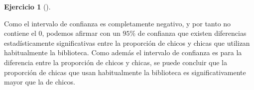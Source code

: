 \documentclass[
  a4paper,
]{scrreport}
\theoremstyle{definition}
\newtheorem{exercise}{Ejercicio}[chapter]
\theoremstyle{remark}
\begin{document}
\begin{exercise}[]
\begin{enumerate}
\begin{tcolorbox}
\begin{tcolorbox}
  \end{tcolorbox}

  Como el intervalo de confianza es completamente negativo, y por tanto
  no contiene el \(0\), podemos afirmar con un \(95\%\) de confianza que
  existen diferencias estadísticamente significativas entre la
  proporción de chicos y chicas que utilizan habitualmente la
  biblioteca. Como además el intervalo de confianza es para la
  diferencia entre la proporción de chicos y chicas, se puede concluir
  que la proporción de chicas que usan habitualmente la biblioteca es
  significativamente mayor que la de chicos.

  \end{tcolorbox}
\end{enumerate}

\end{exercise}
\end{document}

